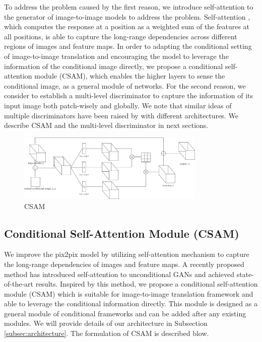To address the problem caused by the first reason, we introduce self-attention to the generator of image-to-image models to address the problem.
Self-attention \cite{Non-local, Attention, MachineReading, SAGANs}, which computes the response at a position as a weighted sum of the features at all positions, is able to capture the long-range dependencies across different regions of images and feature maps. In order to adapting the conditional setting of image-to-image translation and encouraging the model to leverage the information of the conditional image directly, we propose a conditional self-attention module (CSAM), which enables the higher layers to sense the conditional image, as a general module of networks.
%
For the second reason, we consider to establish a multi-level discriminator to capture the information of its input image both patch-wisely and globally. We note that similar ideas of multiple discriminators have been raised by \cite{LaplaceGANs, SGANs, StackGANs, CRN} with different architectures. We describe CSAM and the multi-level discriminator in next sections.
%
%
\begin{figure}
	\includegraphics[width=0.8\textwidth]{figures/CSAM}
	\caption{CSAM}
	\label{fig:CSAM}
\end{figure}
%
%
\subsection{Conditional Self-Attention Module (CSAM)}
\label{subsec:CSAM}
We improve the pix2pix model by utilizing self-attention mechanism to capture the long-range dependencies of images and feature maps. A recently proposed method \cite{SAGANs} has introduced self-attention to unconditional GANs and achieved state-of-the-art results. Inspired by this method, we propose a conditional self-attention module (CSAM) which is suitable for image-to-image translation framework and able to leverage the conditional information directly. This module is designed as a general module of conditional frameworks and can be added after any existing modules. We will provide details of our architecture in Subsection \ref{subsec:architecture}. The formulation of CSAM is described blow.

